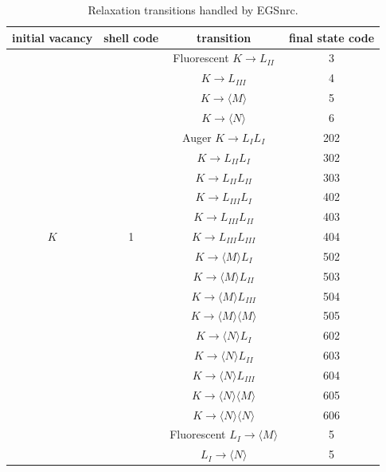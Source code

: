 \begin{table}[phtb]
\caption{\label{relax_transitions} Relaxation transitions handled
by EGSnrc.}
\begin{center}
\begin{tabular}{|c|c|c|c|}
\hline \hline
initial vacancy & shell code & transition & final state code \\
\hline \hline
 & & Fluorescent $K \to L_{II}$ & \phantom{00}3 \\
 & & \phantom{Fluorescent} $K \to L_{III}$ & \phantom{00}4 \\
 & & \phantom{Fluorescent} $K \to \langle M \rangle$ & \phantom{00}5 \\
 & & \phantom{Fluorescent} $K \to \langle N \rangle$ & \phantom{00}6 \\
 & & Auger $K \to L_I L_I$ & 202 \\
 & & \phantom{Auger} $K \to L_{II} L_{I}$ & 302 \\
 & & \phantom{Auger} $K \to L_{II} L_{II}$ & 303 \\
 & & \phantom{Auger} $K \to L_{III} L_{I}$ & 402 \\
 & & \phantom{Auger} $K \to L_{III} L_{II}$ & 403 \\
 $K$ & 1 & \phantom{Auger} $K \to L_{III} L_{III}$ & 404 \\
 & & \phantom{Auger} $K \to \langle M \rangle L_{I}$ & 502 \\
 & & \phantom{Auger} $K \to \langle M \rangle L_{II}$ & 503 \\
 & & \phantom{Auger} $K \to \langle M \rangle L_{III}$ & 504 \\
 & & \phantom{Auger} $K \to \langle M \rangle \langle M \rangle $ & 505 \\
 & & \phantom{Auger} $K \to \langle N \rangle L_{I}$ & 602 \\
 & & \phantom{Auger} $K \to \langle N \rangle L_{II}$ & 603 \\
 & & \phantom{Auger} $K \to \langle N \rangle L_{III}$ & 604 \\
 & & \phantom{Auger} $K \to \langle N \rangle \langle M \rangle $ & 605 \\
 & & \phantom{Auger} $K \to \langle N \rangle \langle N \rangle $ & 606 \\
\hline
& & Fluorescent $L_I \to \langle M \rangle$ & \phantom{00}5 \\
& & \phantom{Fluorescent} $L_I \to \langle N \rangle$ & \phantom{00}5 \\

\end{tabular}
\end{center}
\end{table}

